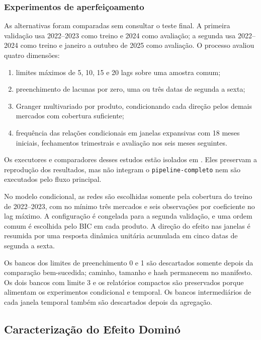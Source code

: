 \documentclass[12pt,a4paper]{article}
\begin{document}
\subsubsection{Experimentos de aperfeiçoamento}

As alternativas foram comparadas sem consultar o teste final. A primeira
validação usa 2022--2023 como treino e 2024 como avaliação; a segunda usa
2022--2024 como treino e janeiro a outubro de 2025 como avaliação. O processo
avaliou quatro dimensões:

\begin{enumerate}
    \item limites máximos de 5, 10, 15 e 20 lags sobre uma amostra comum;
    \item preenchimento de lacunas por zero, uma ou três datas de segunda a
    sexta;
    \item Granger multivariado por produto, condicionando cada direção pelos
    demais mercados com cobertura suficiente;
    \item frequência das relações condicionais em janelas expansivas com 18
    meses iniciais, fechamentos trimestrais e avaliação nos seis meses
    seguintes.
\end{enumerate}

Os executores e comparadores desses estudos estão isolados em
. Eles preservam a reprodução dos resultados, mas
não integram o \texttt{pipeline-completo} nem são executados pelo fluxo
principal.

No modelo condicional, as redes são escolhidas somente pela cobertura do treino
de 2022--2023, com no mínimo três mercados e seis observações por coeficiente no
lag máximo. A configuração é congelada para a segunda validação, e uma ordem
comum é escolhida pelo BIC em cada produto. A direção do efeito nas janelas é
resumida por uma resposta dinâmica unitária acumulada em cinco datas de segunda
a sexta.

Os bancos dos limites de preenchimento 0 e 1 são descartados somente depois da
comparação bem-sucedida; caminho, tamanho e hash permanecem no manifesto. Os
dois bancos com limite 3 e os relatórios compactos são preservados porque
alimentam os experimentos condicional e temporal. Os bancos intermediários de
cada janela temporal também são descartados depois da agregação.

\subsection{Caracterização do Efeito Dominó}
\end{document}
